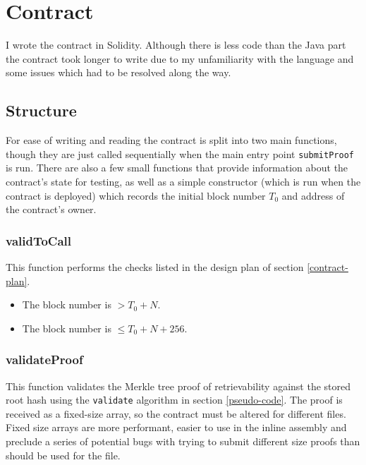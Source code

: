 \documentclass[12pt,a4paper,twoside,openright]{report}
\begin{document}
\section{Contract}

I wrote the contract in Solidity.
Although there is less code than the Java part the contract took longer to write due to my unfamiliarity with the language and
some issues which had to be resolved along the way.

\subsection{Structure}

For ease of writing and reading the contract is split into two main functions, though they are just called sequentially when
the main entry point \texttt{submitProof} is run.
There are also a few small functions that provide information about the contract's state for testing, as well as a simple
constructor (which is run when the contract is deployed) which records the initial block number $T_0$ and address of the contract's owner.

\subsubsection{validToCall}

This function performs the checks listed in the design plan of section \ref{contract-plan}.
\begin{itemize}
\item The block number is $> T_0 + N$.
\item The block number is $\leq T_0 + N + 256$.
\end{itemize}

\subsubsection{validateProof}

This function validates the Merkle tree proof of retrievability against the stored root hash using the \texttt{validate} algorithm in section \ref{pseudo-code}.
The proof is received as a fixed-size array, so the contract must be altered for different files.
Fixed size arrays are more performant, easier to use in the inline assembly and preclude a series of potential bugs with trying to submit different size proofs than
should be used for the file.


\end{document}
